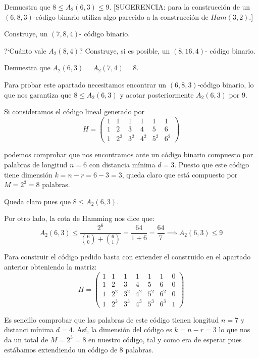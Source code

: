 \begin{problem}[8]
\ppart Demuestra que $8\le A_2(6,3)\le 9$. [SUGERENCIA: para la construcción
de un $(6,8,3)$-código binario utiliza algo parecido a la
construcción de $Ham(3,2)$.]

\ppart   Construye, un
$(7,8,4)$- código binario.

\ppart ?`Cuánto vale $A_2(8,4)$? Construye, si es posible, un
$(8,16,4)$- código binario.

\ppart Demuestra que $A_2(6,3)=A_2(7,4)=8$.
\solution

\spart
{}

Para probar este apartado necesitamos encontrar un $(6,8,3)$-código binario, lo que nos garantiza que $8 \leq A_2(6,3)$ y acotar posteriormente $A_2(6,3)$ por 9.

Si consideramos el código lineal generado por
\[H=\left(\begin{array}{cccccc}
1 & 1 & 1 & 1 & 1 & 1 \\
1 & 2 & 3 & 4 & 5 & 6 \\
1 & 2^2 & 3^2 & 4^2 & 5^2 & 6^2
 \end{array} \right)\]

podemos comprobar que nos encontramos ante un código binario compuesto por palabras de longitud $n=6$ con distancia mínima $d=3$. Puesto que este código tiene dimensión $k=n-r=6-3=3$, queda claro que está compuesto por $M=2^3=8$ palabras.

Queda claro pues que $8 \leq A_2(6,3)$.

Por otro lado, la cota de Hamming nos dice que:
\[A_2(6,3) \leq \frac{2^6}{{6 \choose 0 } + {6 \choose 1}}=\frac{64}{1+6}=\frac{64}{7} \implies A_2(6,3) \leq 9 \]

\spart
{}

Para construir el código pedido basta con extender el construido en el apartado anterior obteniendo la matriz:
\[H=\left(\begin{array}{ccccccc}
1 & 1 & 1 & 1 & 1 & 1 & 0\\
1 & 2 & 3 & 4 & 5 & 6 & 0\\
1 & 2^2 & 3^2 & 4^2 & 5^2 & 6^2 & 0\\
1 & 2^3 & 3^3 & 4^3 & 5^3 & 6^3 & 1
 \end{array} \right)\]

Es sencillo comprobar que las palabras de este código tienen longitud $n=7$ y distanci mínima $d=4$. Así, la dimensión del código es $k=n-r=3$ lo que nos da un total de $M=2^3=8$ en nuestro código, tal y como era de esperar pues estábamos extendiendo un código de 8 palabras.


\end{problem}
